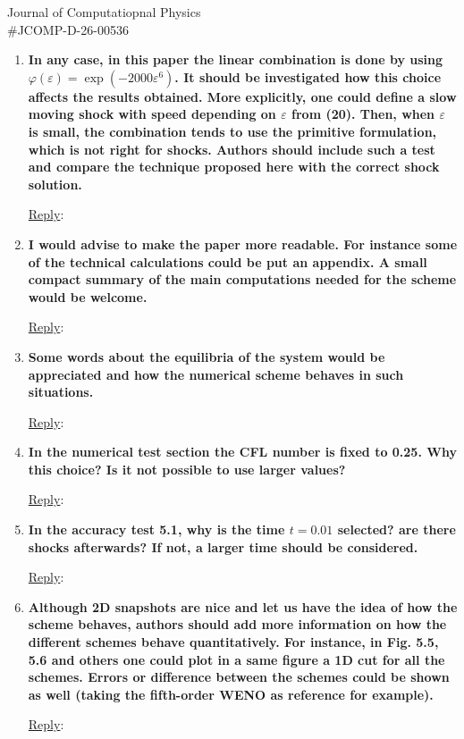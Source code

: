 \documentclass[letter,11pt]{letter}
\begin{document}
\begin{letter}{Journal of Computatiopnal Physics\\\#JCOMP-D-26-00536}
\begin{enumerate}
\medskip
{\sc\underline{Reply}}:

\medskip
\item
{\bf In any case, in this paper the linear combination is done by using $\varphi(\varepsilon)=\exp(-2000\varepsilon^6)$. It should be investigated how this choice affects the results obtained. More explicitly, one could define a slow moving shock with speed depending on $\varepsilon$ from (20). Then, when $\varepsilon$ is small, the combination tends to use the primitive formulation, which is not right for shocks. Authors should include such a test and compare the technique proposed here with the correct shock solution.}

\medskip
{\sc\underline{Reply}}:

\medskip
\item
{\bf I would advise to make the paper more readable. For instance some of the technical calculations could be put an appendix. A small compact summary of the main computations needed for the scheme would be welcome.}

\medskip
{\sc\underline{Reply}}:

\medskip
\item
{\bf Some words about the equilibria of the system would be appreciated and how the numerical scheme behaves in such situations.}

\medskip
{\sc\underline{Reply}}:

\medskip
\item
{\bf In the numerical test section the CFL number is fixed to 0.25. Why this choice? Is it not possible to use larger values?}

\medskip
{\sc\underline{Reply}}:

\medskip
\item
{\bf In the accuracy test 5.1, why is the time $t=0.01$ selected? are there shocks afterwards? If not, a larger time should be considered.}

\medskip
{\sc\underline{Reply}}:

\medskip
\item
{\bf Although 2D snapshots are nice and let us have the idea of how the scheme behaves, authors should add more information on how the different schemes behave quantitatively. For instance, in Fig. 5.5, 5.6 and others one could plot in a same figure a 1D cut for all the schemes. Errors or difference between the schemes could be shown as well (taking the fifth-order WENO as reference for example).}

\medskip
{\sc\underline{Reply}}:


\end{enumerate}
\end{letter}
\end{document}
